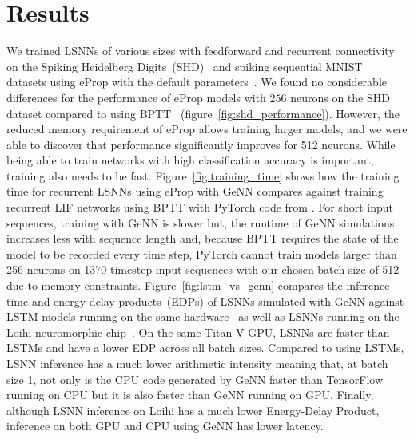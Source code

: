 \documentclass[sigconf]{acmart}
\begin{document}
\section{Results}
We trained LSNNs of various sizes with feedforward and recurrent connectivity on the Spiking Heidelberg Digits~(SHD)~\citep{Cramer2020} and spiking sequential MNIST~\citep{Plank2021} datasets using eProp with the default parameters~\citep{Bellec2020}.
We found no considerable differences for the performance of eProp models with $256$ neurons on the SHD dataset compared to using BPTT~\citep{Zenke2021a}  (figure~\ref{fig:shd_performance}). 
However, the reduced memory requirement of eProp allows training larger models, and we were able to discover that performance significantly improves for \num{512} neurons. 
While being able to train networks with high classification accuracy is important, training also needs to be fast.
Figure~\ref{fig:training_time} shows how the training time for recurrent LSNNs using eProp with GeNN compares against training recurrent LIF networks using BPTT with PyTorch code from \citet{Zenke2021a}.
For short input sequences, training with GeNN is slower but, the runtime of GeNN simulations increases less with sequence length and, because BPTT requires the state of the model to be recorded every time step, PyTorch cannot train models larger than \num{256} neurons on \num{1370} timestep input sequences with our chosen batch size of \num{512} due to memory constraints.
Figure~\ref{fig:lstm_vs_genn} compares the inference time and energy delay products~(EDPs) of LSNNs simulated with GeNN against LSTM models running on the same hardware~\citep{Plank2021} as well as LSNNs running on the Loihi neuromorphic chip~\citep{Davies2018}.
On the same Titan V GPU, LSNNs are faster than LSTMs and have a lower EDP across all batch sizes.
Compared to using LSTMs, LSNN inference has a much lower arithmetic intensity meaning that, at batch size 1, not only is the CPU code generated by GeNN faster than TensorFlow running on CPU but it is also faster than GeNN running on GPU.
Finally, although LSNN inference on Loihi has a much lower Energy-Delay Product, inference on both GPU and CPU using GeNN has lower latency.
\end{document}
